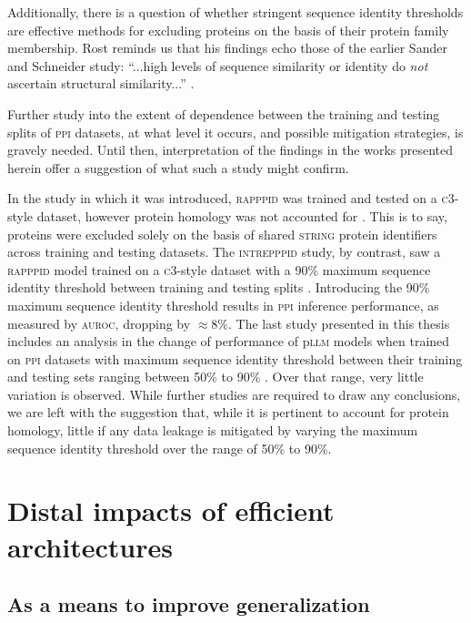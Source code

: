 Additionally, there is a question of whether stringent sequence identity thresholds are effective methods for excluding proteins on the basis of their protein family membership. Rost reminds us that his findings echo those of the earlier Sander and Schneider study: ``...high levels of sequence similarity or identity do \textit{not} ascertain structural similarity...'' \cite{rost_twilight_zone}.

Further study into the extent of dependence between the training and testing splits of \textsc{ppi} datasets, at what level it occurs, and possible mitigation strategies, is gravely needed. Until then, interpretation of the findings in the works presented herein offer a suggestion of what such a study might confirm. 

In the study in which it was introduced, \textsc{rapppid} was trained and tested on a \textsc{c3}-style dataset, however protein homology was not accounted for \cite{rapppid}. This is to say, proteins were excluded solely on the basis of shared \textsc{string} protein identifiers across training and testing datasets. The \textsc{intrepppid} study, by contrast, saw a \textsc{rapppid} model trained on a \textsc{c3}-style dataset with a 90\% maximum sequence identity threshold between training and testing splits \cite{intrepppid}. Introducing the 90\% maximum sequence identity threshold results in \textsc{ppi} inference performance, as measured by \textsc{auroc}, dropping by $\approx8\%$. The last study presented in this thesis includes an analysis in the change of performance of p\textsc{llm} models when trained on \textsc{ppi} datasets with maximum sequence identity threshold between their training and testing sets ranging between 50\% to 90\% \cite{szymborski_emad_2025}. Over that range, very little variation is observed. While further studies are required to draw any conclusions, we are left with the suggestion that, while it is pertinent to account for protein homology, little if any data leakage is mitigated by varying the maximum sequence identity threshold over the range of 50\% to 90\%.

\section*{Distal impacts of efficient architectures}

\subsection*{As a means to improve generalization}

